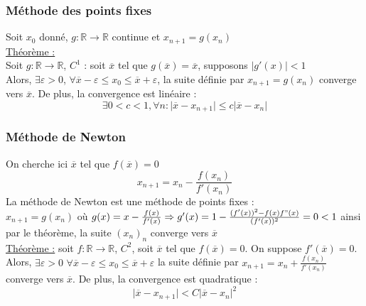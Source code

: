 \documentclass[../main.tex]{subfiles}
\begin{document}
\subsubsection{Méthode des points fixes}
Soit $x_0$ donné, $g:\mathbb{R}\rightarrow\mathbb{R}$ continue et $x_{n+1} = g(x_n)$\\

\quad \underline{Théorème :}\\
Soit $g:\mathbb{R}\rightarrow\mathbb{R}$, $C^1$ : soit $\overline{x}$ tel que $g(\overline{x})=\overline{x}$, supposons $\lvert g'(x)\rvert < 1$\\
Alors, $\exists \varepsilon>0$, $\forall \overline{x}-\varepsilon \leq x_0 \leq \overline{x}+\varepsilon$, la suite définie par $x_{n+1} = g(x_n)$ converge vers $\overline{x}$. De plus, la convergence est linéaire :\\
\begin{equation}
    \exists 0 < c < 1, \forall n : \lvert \overline{x}-x_{n+1}\rvert \leq c \lvert \overline{x}-x_n\rvert 
\end{equation}

\subsubsection{Méthode de Newton}
On cherche ici $\overline{x}$ tel que $f(\overline{x})= 0$\\
\begin{equation}
    x_{n+1} = x_n - \frac{f(x_n)}{f'(x_n)}
\end{equation}
La méthode de Newton est une méthode de points fixes : \\
$x_{n+1} = g(x_n)$ où $g(x) = x-\frac{f(x)}{f'(x)} \Rightarrow g'(x) = 1- \frac{(f'(x))^2-f(x)f"(x)}{(f'(x))^2} = 0<1$ ainsi par le théorème, la suite $(x_n)_n$ converge vers $\overline{x}$\\

\quad \underline{Théorème :} soit $f:\mathbb{R}\rightarrow \mathbb{R}$, $C^2$, soit $\overline{x}$ tel que $f(\overline{x})=0$. On suppose $f'(\overline{x})=0$.\\
Alors, $\exists \varepsilon>0$ $\forall \overline{x}-\varepsilon \leq x_0 \leq \overline{x}+\varepsilon$ la suite définie par $x_{n+1} = x_n + \frac{f(x_n)}{f'(x_n)}$ converge vers $\overline{x}$. De plus, la convergence est quadratique :\\
\begin{equation}
    \lvert \overline{x}-x_{n+1}\rvert < C \lvert \overline{x}-x_n\rvert ^2
\end{equation}
\end{document}
